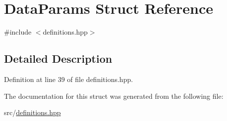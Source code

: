 \hypertarget{structDataParams}{\section{Data\+Params Struct Reference}
\label{structDataParams}
}


{\ttfamily \#include $<$definitions.\+hpp$>$}



\subsection{Detailed Description}


Definition at line 39 of file definitions.\+hpp.



The documentation for this struct was generated from the following file\+:\begin{DoxyCompactItemize}
\item 
src/\hyperlink{definitions_8hpp}{definitions.\+hpp}\end{DoxyCompactItemize}
